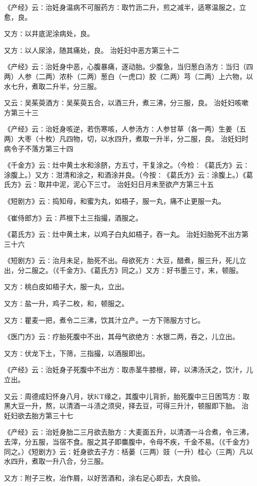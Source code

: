 \documentclass[a4paper,12pt,UTF8,twoside]{ctexbook}
\begin{document}
《产经》云∶治妊身温病不可服药方∶取竹沥二升，煎之减半，适寒温服之，立愈，良。

又方∶以井底泥涂病处，良。

又方∶以人尿涂，随其痛处，良。
治妊妇中恶方第三十二

《产经》云∶治妊身中恶，心腹暴痛，逐动胎。少腹急，当归葱白汤方∶当归（四两）人参（二两）浓朴（二两）葱白（一虎口）胶（二两）芎（二两）上六物，以水七升，煮取二升半，分三服。

又云∶吴茱萸酒方∶吴茱萸五合，以酒三升，煮三沸，分三服，良。
治妊妇咳嗽方第三十三

《产经》云∶治妊身咳逆，若伤寒咳，人参汤方∶人参甘草（各一两）生姜（五两）大枣（十枚）凡四物，切，以水四升，煮取一升半，分二服，良。
治妊妇时病令子不落方第三十四

《千金方》云∶灶中黄土水和涂脐，方五寸，干复涂之。（今检∶《葛氏方》云∶涂腹上。）又方∶泔清和涂之，和酒涂并良。（今按∶《葛氏方》云∶涂腹上。）《葛氏方》云∶取井中泥，泥心下三寸。
治妊妇日月未至欲产方第三十五

《短剧方》云∶捣知母，和蜜为丸，如梧子，服一丸，痛不止更服一丸。

《崔侍郎方》云∶芦根下土三指撮，酒服之。

《葛氏方》云∶灶中黄土末，以鸡子白丸如梧子，吞一丸。
治妊妇胎死不出方第三十六

《短剧方》云∶治月未足，胎死不出。母欲死方∶大豆，醋煮，服三升，死儿立出，分二服之。（《千金方》、《葛氏方》同之。）又方∶好书墨三寸，末，顿服。

又方∶桃白皮如梧子大，服一丸，立出。

又方∶盐一升，鸡子二枚，和，顿服之。

又方∶瞿麦一把，煮令二三沸，饮其汁立产。一方下筛服方寸匕。

《医门方》云∶疗胎死腹中不出，其母气欲绝方∶水银二两，吞之，儿立出。

又方∶伏龙下土，下筛，三指撮，以酒服即出。

《产经》云∶治妊身子死腹中不出方∶取赤茎牛膝根，碎，以沸汤沃之，饮汁，儿立出。

又云∶周德成妇怀身八月，状KT缘之，其腹中儿背折，胎死腹中三日困笃方∶取黑大豆一升，熬，以清酒一斗渍之须臾，择去豆，可得三升汁，顿服即下胎。
治妊妇欲去胎方第三十七

《产经》云∶治妊身胎二三月欲去胎方∶大麦面五升，以清酒一斗合煮，令三沸，去滓，分五服，当宿不食。服之其子即麋腹中，令母不疾，千金不易。（《千金方》同之。）《短剧方》云∶妊身欲去子方∶栝蒌（三两）豉（一升）桂心（三两）凡以水四升，煮取一升八合，分三服。

又方∶附子三枚，冶作屑，以好苦酒和，涂右足心即去，大良验。
\end{document}
